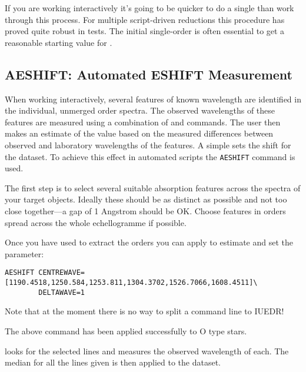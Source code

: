 If you are working interactively it's going to be quicker to do a single
 than work through this process.  For multiple script-driven
reductions this procedure has proved quite robust in tests.  The initial
single-order 
 is often essential to get a reasonable starting value
for .

\subsection{AESHIFT: Automated ESHIFT Measurement}

When working interactively, several features of known wavelength are
identified in the individual, unmerged order spectra.  The observed wavelengths
of these features are measured using a combination of
 and 
commands.  The user then makes an estimate of the
 value based on the measured differences between observed
and laboratory wavelengths of the features.  A simple
 sets the shift for the dataset.
To achieve this effect in automated scripts the \verb+AESHIFT+ command is
used.

The first step is to select several suitable absorption features across the
spectra of your target objects.  Ideally these should be as distinct as
possible and not too close together---a gap of 1 Angstrom should be OK\@.
Choose features in orders spread across the whole echellogramme if possible.

Once you have used  to extract the orders you
can apply  to estimate and set the
 parameter:

\begin{verbatim}
AESHIFT CENTREWAVE=[1190.4518,1250.584,1253.811,1304.3702,1526.7066,1608.4511]\
        DELTAWAVE=1
\end{verbatim}

Note that at the moment there is no way to split a command line to IUEDR!

The above command has been applied successfully to O type stars.

 looks for the selected lines and measures the observed
wavelength of each.  The median 
 for all the lines given is then
applied to the dataset.

